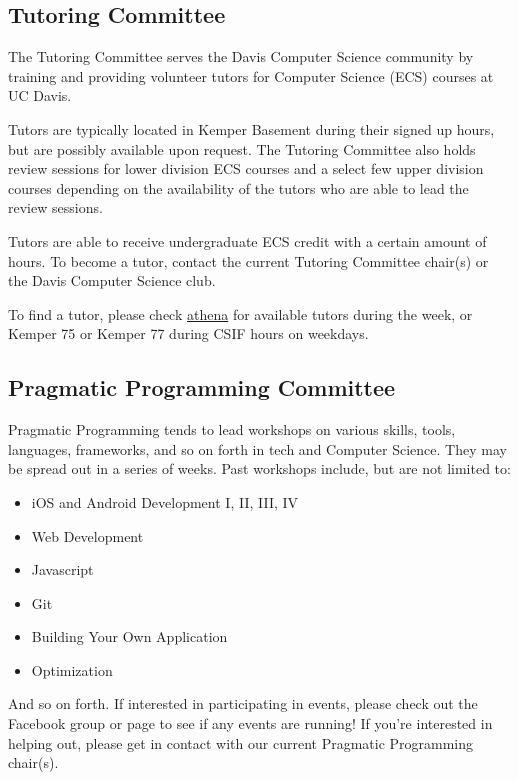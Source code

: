 \documentclass{article}
\begin{document}
\subsection{Tutoring Committee}
The Tutoring Committee serves the Davis Computer Science community by training
and providing volunteer tutors for Computer Science (ECS) courses at UC
Davis.

Tutors are typically located in Kemper Basement during their signed up hours,
but are possibly available upon request. The Tutoring Committee also holds
review sessions for lower division ECS courses and a select few upper division
courses depending on the availability of the tutors who are able to lead the
review sessions.

Tutors are able to receive undergraduate ECS credit with a certain amount of
hours. To become a tutor, contact the current Tutoring Committee chair(s) or the
Davis Computer Science club.

To find a tutor, please check
\href{https://daviscsclub.org/tutoring/athena}{athena} for available tutors
during the week, or Kemper 75 or Kemper 77 during CSIF hours on weekdays.

\subsection{Pragmatic Programming Committee}
Pragmatic Programming tends to lead workshops on various skills, tools,
languages, frameworks, and so on forth in tech and Computer Science. They may be
spread out in a series of weeks. Past workshops include, but are not limited to:
\begin{itemize}
    \item iOS and Android Development I, II, III, IV
    \item Web Development
    \item Javascript
    \item Git
    \item Building Your Own Application 
    \item Optimization 
\end{itemize}

And so on forth. If interested in participating in events, please check out the
Facebook group or page to see if any events are running! If you're interested in
helping out, please get in contact with our current Pragmatic Programming
chair(s).
\end{document}
